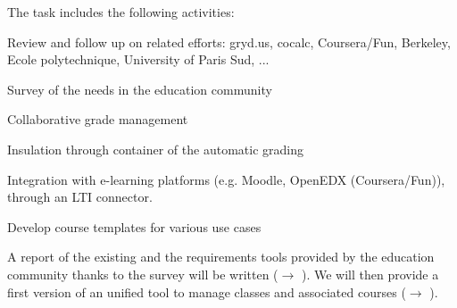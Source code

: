 \begin{task}[
  title=Teaching tools,
  id=teaching-tools,
  lead=EP,
  PM=20, %
  wphases={0-36},
  partners={EP,UPSUD}]
  The task includes the following activities:
  \begin{compactitem}
  \item Review and follow up on related efforts: gryd.us, cocalc, Coursera/Fun,
    Berkeley, Ecole polytechnique, University of Paris Sud, ...
  \item Survey of the needs in the education community
  \item Collaborative grade management
  \item Insulation through container of the automatic grading
  \item Integration with e-learning platforms (e.g. Moodle, OpenEDX
    (Coursera/Fun)), through an LTI connector.
  \item Develop course templates for various use cases
  \end{compactitem}
  A report of the existing and the requirements tools provided by the education
  community thanks to the survey will be written ($\rightarrow$
  ). We will then provide a first version of an
  unified tool to manage classes and associated courses ($\rightarrow$
  ).
\end{task}
